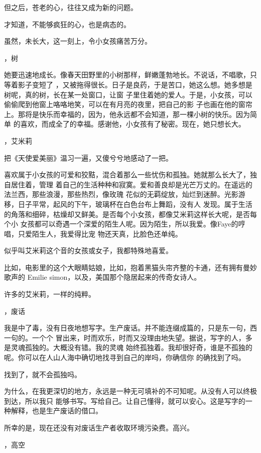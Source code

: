 \documentclass[12pt,a4paper]{article}
\newcommand{\subpart}[1]{
	\begingroup \par
	\vspace{1ex} \centering #1
	\par \endgroup
}
\begin{document}
		但之后，苍老的心，往往又成为新的问题。

		才知道，不能够疯狂的心，也是病态的。

		虽然，未长大，这一刻上，令小女孩痛苦万分。


		\subpart{2，树}

		她要迅速地成长。像春天田野里的小树那样，鲜嫩蓬勃地长。不说话，不唱歌，只等着影子变短了
	，又被拖得很长。日子是良药，于是苦口，她这么想。她多想是树呢，真的树，长在某一处窗口，让窗
	子里住着她的爱人。于是，小女孩，可以偷偷爬到他窗上咯咯地笑，可以在有月亮的夜里，把自己的影
	子也画在他的窗帘上。那将是快乐而幸福的，因为，他永远都不会知道，那一棵小树的快乐。因为简单
	的喜欢，而成全了的幸福。感谢他，小女孩有了秘密。现在，她只想长大。


		\subpart{3，艾米莉}

		把《天使爱美丽》温习一遍，又傻兮兮地感动了一把。

		喜欢属于小女孩的可爱和狡黠，混合着那么一些忧伤和孤独。她就那么长大了，独自居住着，管理
	着自己的生活种种和寂寞。爱和善良却是光芒万丈的。在遥远的法兰西，那些浪漫，那些热烈，像玫瑰
	花似的无羁绽放，灿烂到迷醉。光影游移，日子平常，起风的下午，玻璃杯在白色台布上舞蹈，没有人
	发现。属于生活的角落和细碎，枯燥却又鲜美。是否每个小女孩，都像艾米莉这样长大呢，是否每个小
	女孩都可以奇遇一个深爱的陌生人呢。因为陌生，所以我爱。像Faye的哼唱，只爱陌生人，我爱得比宠
	物还天真，比脸色还单纯。

		似乎叫艾米莉这个音的女孩或女子，我都特殊地喜爱。

		比如，电影里的这个大眼睛姑娘，比如，抱着黑猫头帘齐整的卡通，还有拥有曼妙歌声的 Emilie
	simon，以及，美国那个隐居起来的传奇女诗人。

		许多的艾米莉，一样的纯粹。


		\subpart{4，废话}

		我是中了毒，没有日夜地想写字。生产废话。并不能连缀成篇的，只是东一句，西一句的。一个个
	冒出来，时而欢乐，时而又没理由地失望。据说，写字的人，多是灵魂孤独的。大概没有错。我的灵魂
	始终孤独着。我却很好奇，谁是不孤独的呢。你可以在人山人海中确切地找寻到自己的岸吗，你确信你
	的确找到了吗。

		找到了，就不会孤独吗。

		为什么，在我更深切的地方，永远是一种无可填补的不可知呢。从没有人可以终极到达，所以我只
	能够书写。写给自己。让自己懂得，就可以安心。这是写字的一种解释，也是生产废话的借口。

		所幸的是，现在还没有对废话生产者收取环境污染费。高兴。


		\subpart{5，高空}
\end{document}
